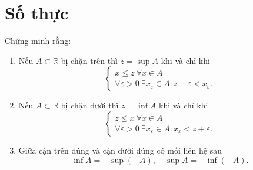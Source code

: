 \documentclass[class=analysis,crop=false]{standalone}
\begin{document}
\setcounter{exercise}{0}

\chapter{Số thực}

\begin{exercise}\label{chapter1:sup-and-inf}
    Chứng minh rằng:
    \begin{enumerate}[label = (\roman*)]
        \item Nếu $A\subset\mathbb{R}$ bị chặn trên thì $z = \sup A$ khi và chỉ khi
              \[
                  \begin{cases}
                      x\le z\ \forall x\in A \\
                      \forall\varepsilon > 0\ \exists x_{\varepsilon}\in A : z - \varepsilon < x_{\varepsilon}.
                  \end{cases}
              \]
        \item Nếu $A\subset\mathbb{R}$ bị chặn dưới thì $z = \inf A$ khi và chỉ khi
              \[
                  \begin{cases}
                      z\le x\ \forall x\in A \\
                      \forall\varepsilon > 0\ \exists x_{\varepsilon}\in A : x_{\varepsilon} < z + \varepsilon.
                  \end{cases}
              \]
        \item Giữa cận trên đúng và cận dưới đúng có mối liên hệ sau
              \[
                  \inf A = -\sup(-A),\quad \sup A = -\inf(-A).
              \]
    \end{enumerate}
\end{exercise}
\end{document}
